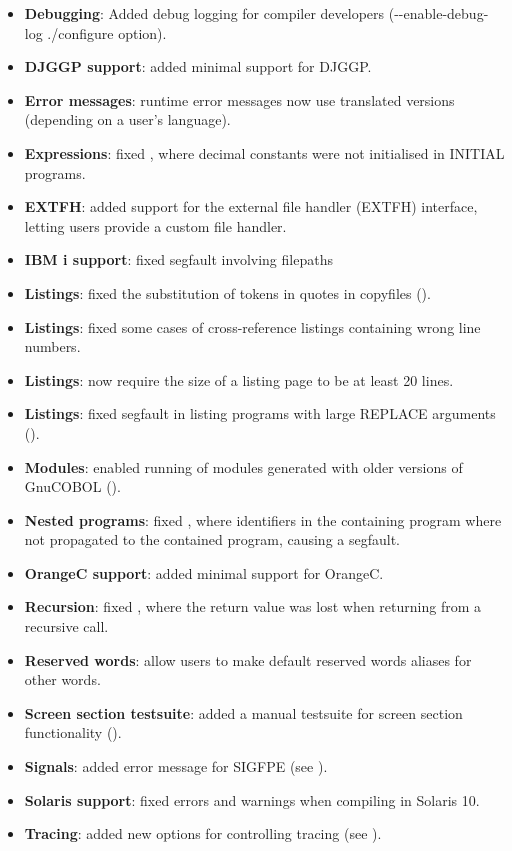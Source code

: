 \begin{itemize}
\item \textbf{Debugging}: Added debug logging for compiler developers (-{}-enable-debug-log ./configure option).
\item \textbf{DJGGP support}: added minimal support for DJGGP.
\item \textbf{Error messages}: runtime error messages now use translated versions (depending on a user's language).
\item \textbf{Expressions}: fixed , where decimal constants were not initialised in INITIAL programs.
\item \textbf{EXTFH}: added support for the external file handler (EXTFH) interface, letting users provide a custom file handler.
\item \textbf{IBM i support}: fixed segfault involving filepaths
\item \textbf{Listings}: fixed the substitution of tokens in quotes in copyfiles ().
\item \textbf{Listings}: fixed some cases of cross-reference listings containing wrong line numbers.
\item \textbf{Listings}: now require the size of a listing page to be at least 20 lines.
\item \textbf{Listings}: fixed segfault in listing programs with large REPLACE arguments ().
\item \textbf{Modules}: enabled running of modules generated with older versions of GnuCOBOL ().
\item \textbf{Nested programs}: fixed , where identifiers in the containing program where not propagated to the contained program, causing a segfault.
\item \textbf{OrangeC support}: added minimal support for OrangeC.
\item \textbf{Recursion}: fixed , where the return value was lost when returning from a recursive call.
\item \textbf{Reserved words}: allow users to make default reserved words aliases for other words.
\item  \textbf{Screen section testsuite}: added a manual testsuite for screen section functionality ().
\item \textbf{Signals}: added error message for SIGFPE (see ).
\item \textbf{Solaris support}: fixed errors and warnings when compiling in Solaris 10.
\item \textbf{Tracing}: added new options for controlling tracing (see ).
\end{itemize}

